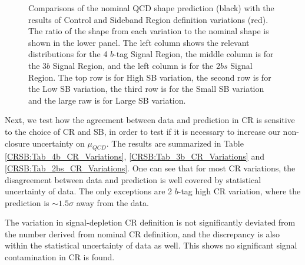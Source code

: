 \begin{figure}[htbp!]
\begin{center}
\end{center}
\caption{Comparisons of the nominal QCD shape prediction (black) with the results of Control and Sideband Region definition variations (red). The ratio of the shape from each variation to the nominal shape is shown in the lower panel. The left column shows the relevant distributions for the 4 $b$-tag Signal Region, the middle column is for the $3b$ Signal Region, and the left column is for the $2bs$ Signal Region. The top row is for High SB variation, the second row is for the Low SB variation, the third row is for the Small SB variation and the large raw is for Large SB variation.}
\label{CRSB:QCDShapeSR-SB}
\end{figure}

\clearpage
Next, we test how the agreement between data and prediction in CR is sensitive to the choice of CR and SB, in order to test if it is necessary to increase our non-closure uncertainty on $\mu_{QCD}$. The results are summarized in Table \ref{CRSB:Tab_4b_CR_Variations}, \ref{CRSB:Tab_3b_CR_Variations} and \ref{CRSB:Tab_2bs_CR_Variations}. One can see that for most CR variations, the disagreement between data and prediction is well covered by statistical uncertainty of data. The only exceptions are 2 $b$-tag high CR variation, where the prediction is $\sim 1.5 \sigma$ away from the data. 

The variation in signal-depletion CR definition is not significantly deviated from the number derived from nominal CR definition, and the discrepancy is also within the statistical uncertainty of data as well. This shows no significant signal contamination in CR is found.


\clearpage
